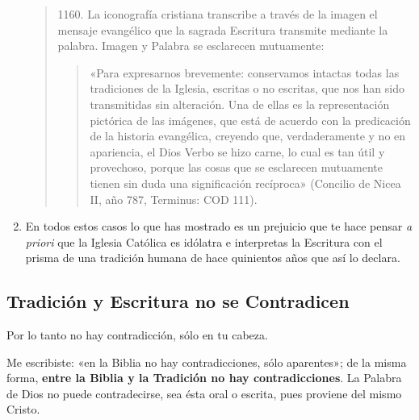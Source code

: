 \documentclass{article}
\begin{document}
\begin{enumerate}
    \begin{quote}
    1160. La iconografía cristiana transcribe a través de la imagen el mensaje evangélico que la sagrada Escritura transmite mediante la palabra. Imagen y Palabra se esclarecen mutuamente:
    
        \begin{quote}
        «Para expresarnos brevemente: conservamos intactas todas las tradiciones de la Iglesia, escritas o no escritas, que nos han sido transmitidas sin alteración. Una de ellas es la representación pictórica de las imágenes, que está de acuerdo con la predicación de la historia evangélica, creyendo que, verdaderamente y no en apariencia, el Dios Verbo se hizo carne, lo cual es tan útil y provechoso, porque las cosas que se esclarecen mutuamente tienen sin duda una significación recíproca» (Concilio de Nicea II, año 787, Terminus: COD 111).
        \end{quote}
    \end{quote}
    
\item
En todos estos casos lo que has mostrado es un prejuicio que te hace pensar \emph{a priori} que la Iglesia Católica es idólatra e interpretas la Escritura con el prisma de una tradición humana de hace quinientos años que así lo declara.
\end{enumerate}

\subsection*{Tradición y Escritura no se Contradicen}

Por lo tanto no hay contradicción, sólo en tu cabeza.

Me escribiste: «en la Biblia no hay contradicciones, sólo aparentes»; de la misma forma, \textbf{entre la Biblia y la Tradición no hay contradicciones}. La Palabra de Dios no puede contradecirse, sea ésta oral o escrita, pues proviene del mismo Cristo.
\end{document}
